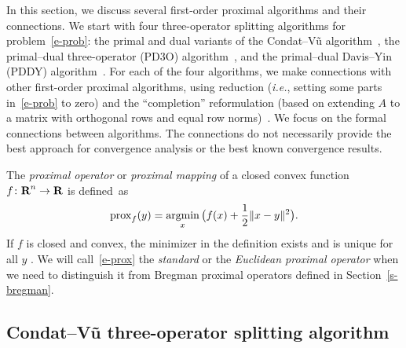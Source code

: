 \documentclass[letterpaper,11pt]{article}
\newcommand{\BEQ}{\begin{equation}}
\newcommand{\EEQ}{\end{equation}}
\newcommand{\ie}{{\it i.e.}}
\newcommand{\argmin}{\mathop{\rm argmin}}
\newcommand{\prox}{\mathrm{prox}}
\newcommand{\reals}{{\mbox{\bf R}}}
\begin{document}
In this section, we discuss several first-order proximal algorithms and 
their connections.
We start with four three-operator splitting algorithms
for problem~\eqref{e-prob}:
the primal and dual variants of the
Condat--V\~u algorithm~\cite{Con:13,Vu:13},
the primal--dual three-operator (PD3O) algorithm~\cite{Yan18},
and the primal--dual Davis--Yin (PDDY) algorithm~\cite{SCMR20}.
For each of the four algorithms, we make connections 
with other first-order proximal algorithms,
using reduction (\ie, setting some parts in~\eqref{e-prob} to zero)
and the ``completion'' reformulation (based on extending $A$ to
a matrix with orthogonal rows and equal row norms)~\cite{OV20}.
We focus on the formal connections between algorithms.
The connections do not necessarily provide the best approach
for convergence analysis or the best known convergence results.

The \emph{proximal operator} or \emph{proximal mapping} of a closed convex 
function $f \colon \reals^n \rightarrow \reals$ is defined~as
\BEQ \label{e-prox}
\prox_f(y) = \argmin_x{\big(f(x)+\frac{1}{2} \|x-y\|^2\big)}.
\EEQ
If $f$ is closed and convex, the minimizer in the definition exists 
and is unique for all $y$ \cite{Mor:65}.
We will call~\eqref{e-prox} the \emph{standard} or the \emph{Euclidean
proximal operator} when we need to distinguish it from Bregman
proximal operators defined in Section~\ref{s-bregman}.

\subsection{Condat--V\~u three-operator splitting algorithm}
\end{document}
